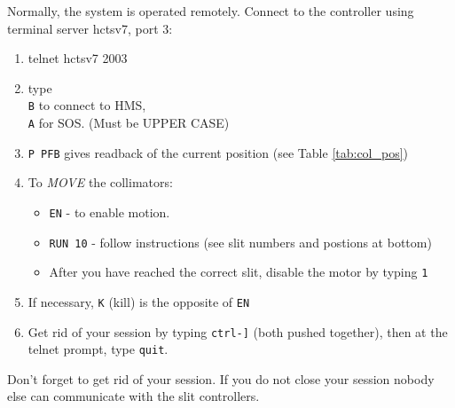 {Normally, the system is operated remotely. Connect to the controller
using terminal server hctsv7, port 3:

\begin{minipage}{6in}
\begin{enumerate}
\item telnet hctsv7 2003
\item type \texttt{\\B} to connect to HMS, \texttt{\\A} for SOS. (Must be UPPER CASE)
\item {\tt P PFB} gives readback of the current position (see Table \ref{tab:col_pos})
\item To {\em MOVE} the collimators:
   \begin{itemize}
	\item {\tt EN} - to enable motion.
	\item {\tt RUN 10} - follow instructions (see slit numbers and postions at bottom)
	\item After you have reached the correct slit, disable the motor by typing {\tt 1}

   \end{itemize}
\item If necessary, \texttt{K} (kill) is the opposite of \texttt{EN}
\item Get rid of your session by typing \texttt{ctrl-]} (both pushed together), then
at the telnet prompt, type \texttt{quit}.
\end{enumerate}
\end{minipage}

Don't forget to get rid of your session. If you do not close your session nobody
else can communicate with the slit controllers.


}
